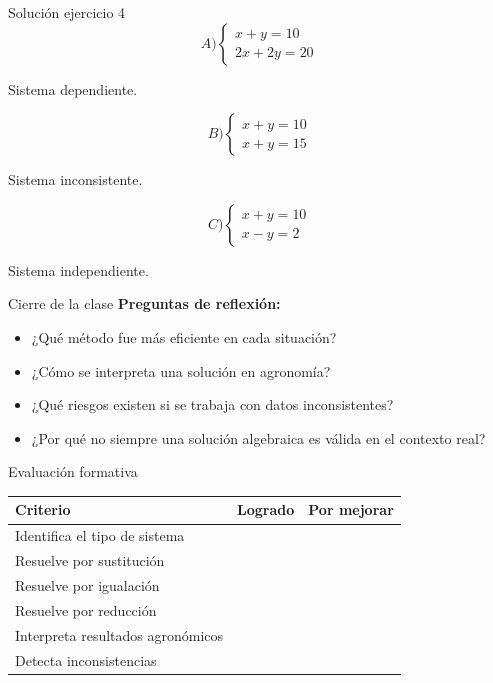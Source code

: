 \documentclass{beamer}
\begin{document}
	\begin{frame}{Solución ejercicio 4}
		\[
		A)
		\begin{cases}
			x+y=10 \\
			2x+2y=20
		\end{cases}
		\]
		
		Sistema dependiente.
		
		\bigskip
		
		\[
		B)
		\begin{cases}
			x+y=10 \\
			x+y=15
		\end{cases}
		\]
		
		Sistema inconsistente.
		
		\bigskip
		
		\[
		C)
		\begin{cases}
			x+y=10 \\
			x-y=2
		\end{cases}
		\]
		
		Sistema independiente.
	\end{frame}
	
	\begin{frame}{Cierre de la clase}
		\textbf{Preguntas de reflexión:}
		
		\begin{itemize}
			\item ¿Qué método fue más eficiente en cada situación?
			\item ¿Cómo se interpreta una solución en agronomía?
			\item ¿Qué riesgos existen si se trabaja con datos inconsistentes?
			\item ¿Por qué no siempre una solución algebraica es válida en el contexto real?
		\end{itemize}
	\end{frame}
	
	\begin{frame}{Evaluación formativa}
		\begin{center}
			\begin{tabular}{|p{6cm}|c|c|}
				\hline
				\textbf{Criterio} & \textbf{Logrado} & \textbf{Por mejorar} \\
				\hline
				Identifica el tipo de sistema & & \\
				\hline
				Resuelve por sustitución & & \\
				\hline
				Resuelve por igualación & & \\
				\hline
				Resuelve por reducción & & \\
				\hline
				Interpreta resultados agronómicos & & \\
				\hline
				Detecta inconsistencias & & \\
				\hline
			\end{tabular}
		\end{center}
	\end{frame}
	
\end{document}
